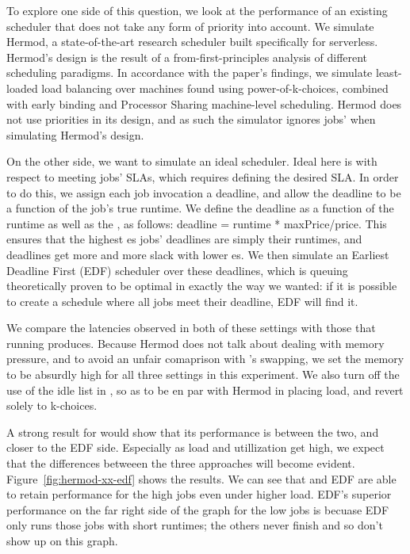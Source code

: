 To explore one side of this question, we look at the performance of an existing
scheduler that does not take any form of priority into account. We simulate
Hermod\cite{hermod}, a state-of-the-art research scheduler built specifically
for serverless. Hermod's design is the result of a from-first-principles
analysis of different scheduling paradigms. In accordance with the paper's
findings, we simulate least-loaded load balancing over machines found using
power-of-k-choices, combined with early binding and Processor Sharing
machine-level scheduling. Hermod does not use priorities in its design, and as
such the simulator ignores jobs' \class{} when simulating Hermod's design.


On the other side, we want to simulate an ideal scheduler. Ideal here is with
respect to meeting jobs' SLAs, which requires defining the desired SLA. In order
to do this, we assign each job invocation a deadline, and allow the deadline to
be a function of the job's true runtime. We define the deadline as a function of
the runtime as well as the \priceclass{}, as follows: deadline = runtime *
maxPrice/price. This ensures that the highest \class{}es jobs' deadlines are
simply their runtimes, and deadlines get more and more slack with lower
\class{}es. We then simulate an Earliest Deadline First (EDF) scheduler over
these deadlines, which is queuing theoretically proven to be optimal in exactly
the way we wanted: if it is possible to create a schedule where all jobs meet
their deadline, EDF will find it\cite{wiki-edf}.

We compare the latencies observed in both of these settings with those that
running \sys{} produces. Because Hermod does not talk about dealing with memory
pressure, and to avoid an unfair comaprison with \sys{}'s swapping, we set the
memory to be absurdly high for all three settings in this experiment. We also
turn off the use of the idle list in \sys{}, so as to be en par with Hermod in
placing load, and revert solely to k-choices.

A strong result for \sys{} would show that its performance is between the two,
and closer to the EDF side. Especially as load and utillization get high, we
expect that the differences betweeen the three approaches will become evident.
Figure~\ref{fig:hermod-xx-edf} shows the results. We can see that \sys{} and EDF
are able to retain performance for the high \class{} jobs even under higher
load. EDF's superior performance on the far right side of the graph for the low
\class{} jobs is becuase EDF only runs those jobs with short runtimes; the
others never finish and so don't show up on this graph.


